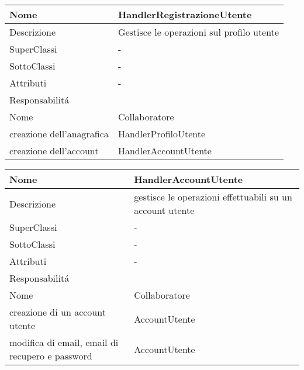\begin{center} %
    \begin{longtable}{ |p{3cm}|p{3cm}|p{3cm}|p{3cm}| }
        \hline
        Nome & \multicolumn{3}{|p{9cm}|}{HandlerRegistrazioneUtente} \\\hline
        Descrizione & \multicolumn{3}{|p{9cm}|}{Gestisce le operazioni sul profilo utente} \\\hline
        SuperClassi & \multicolumn{3}{|p{9cm}|}{-} \\\hline
        SottoClassi & \multicolumn{3}{|p{9cm}|}{-} \\\hline
        Attributi & \multicolumn{3}{|p{9cm}|}{-} \\\hline
        \multicolumn{4}{|p{12cm}|}{Responsabilit\'a} \\\hline %
        \multicolumn{2}{|p{6cm}|}{Nome} & \multicolumn{2}{|p{6cm}|}{Collaboratore} \\\hline %
        \multicolumn{2}{|p{6cm}|}{creazione dell'anagrafica} & \multicolumn{2}{|p{6cm}|}{HandlerProfiloUtente} \\\hline
        \multicolumn{2}{|p{6cm}|}{creazione dell'account} & \multicolumn{2}{|p{6cm}|}{HandlerAccountUtente} \\\hline
        
    \end{longtable}
\end{center}

\begin{center} %
    \begin{longtable}{ |p{3cm}|p{3cm}|p{3cm}|p{3cm}| }
        \hline
        Nome & \multicolumn{3}{|p{9cm}|}{HandlerAccountUtente} \\\hline
        Descrizione & \multicolumn{3}{|p{9cm}|}{gestisce le operazioni effettuabili su un account utente} \\\hline
        SuperClassi & \multicolumn{3}{|p{9cm}|}{-} \\\hline
        SottoClassi & \multicolumn{3}{|p{9cm}|}{-} \\\hline
        Attributi & \multicolumn{3}{|p{9cm}|}{-} \\\hline
        \multicolumn{4}{|p{12cm}|}{Responsabilit\'a} \\\hline %
        \multicolumn{2}{|p{6cm}|}{Nome} & \multicolumn{2}{|p{6cm}|}{Collaboratore} \\\hline %
        \multicolumn{2}{|p{6cm}|}{creazione di un account utente} & \multicolumn{2}{|p{6cm}|}{AccountUtente} \\\hline
        \multicolumn{2}{|p{6cm}|}{modifica di email, email di recupero e password} & \multicolumn{2}{|p{6cm}|}{AccountUtente} \\\hline
    \end{longtable}
\end{center}


